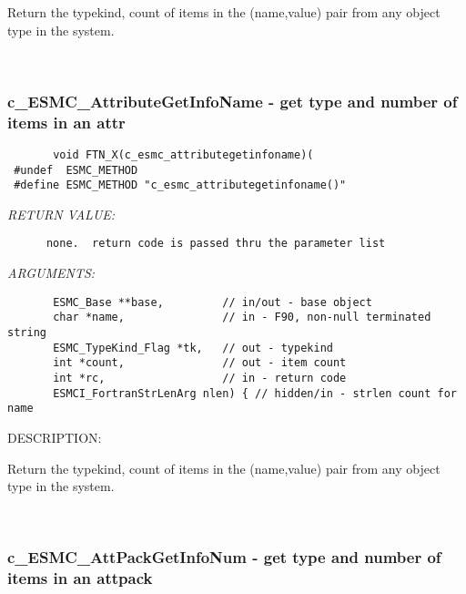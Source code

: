      Return the typekind, count of items in the (name,value) pair from any 
     object type in the system.
   
 
\mbox{}\hrulefill\ 
 
\subsubsection [c\_ESMC\_AttributeGetInfoName] {c\_ESMC\_AttributeGetInfoName - get type and number of items in an attr}


  
\begin{verbatim}       void FTN_X(c_esmc_attributegetinfoname)(
 #undef  ESMC_METHOD
 #define ESMC_METHOD "c_esmc_attributegetinfoname()"\end{verbatim}{\em RETURN VALUE:}
\begin{verbatim}      none.  return code is passed thru the parameter list
   \end{verbatim}{\em ARGUMENTS:}
\begin{verbatim}       ESMC_Base **base,         // in/out - base object
       char *name,               // in - F90, non-null terminated string
       ESMC_TypeKind_Flag *tk,   // out - typekind
       int *count,               // out - item count
       int *rc,                  // in - return code
       ESMCI_FortranStrLenArg nlen) { // hidden/in - strlen count for name
   \end{verbatim}
{\sf DESCRIPTION:\\ }


     Return the typekind, count of items in the (name,value) pair from any 
     object type in the system.
   
 
\mbox{}\hrulefill\ 
 
\subsubsection [c\_ESMC\_AttPackGetInfoNum] {c\_ESMC\_AttPackGetInfoNum - get type and number of items in an attpack}


